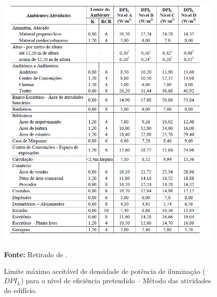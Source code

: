 \begin{figure}[H]
\centering
\includegraphics[width = 1.1\textwidth]{Figuras/tab1_1.PNG}
\caption{Limite máximo aceitável de densidade de potência de iluminação ($DPI_L$) para o nível de eficiência pretendido – Método das atividades do edifício.}
\label{tab2_1}
\textbf{Fonte:} Retirado de \cite{RTQ-C}.
\end{figure}

